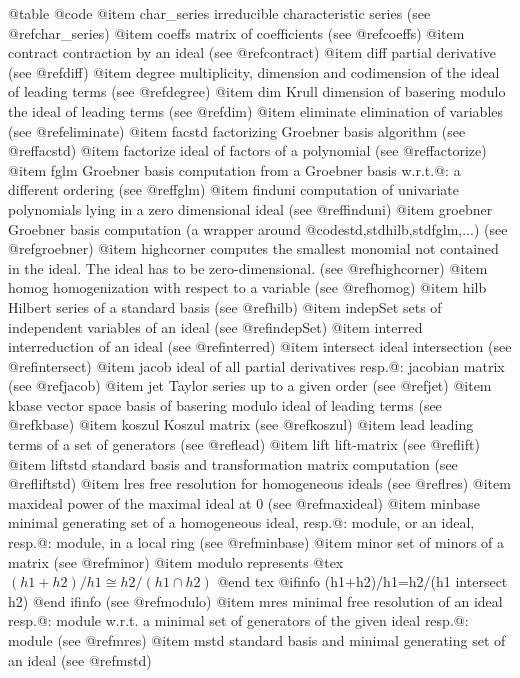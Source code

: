 @table @code
@item char_series
irreducible characteristic series (see @ref{char_series})
@item coeffs
matrix of coefficients (see @ref{coeffs})
@item contract
contraction by an ideal (see @ref{contract})
@item diff
partial derivative (see @ref{diff})
@item degree
multiplicity, dimension and codimension of the ideal of leading terms (see @ref{degree})
@item dim
Krull dimension of basering modulo the ideal of leading terms (see @ref{dim})
@item eliminate
elimination of variables (see @ref{eliminate})
@item facstd
factorizing Groebner basis algorithm (see @ref{facstd})
@item factorize
ideal of factors of a polynomial (see @ref{factorize})
@item fglm
Groebner basis computation from a Groebner basis w.r.t.@: a different
ordering (see @ref{fglm})
@item finduni
computation of univariate polynomials lying in a zero dimensional ideal
(see @ref{finduni})
@item groebner
Groebner basis computation (a wrapper around @code{std,stdhilb,stdfglm},...)
(see @ref{groebner})
@item highcorner
computes the smallest monomial not contained in the ideal.
The ideal has to be zero-dimensional.
(see @ref{highcorner})
@item homog
homogenization with respect to a variable (see @ref{homog})
@item hilb
Hilbert series of a standard basis (see @ref{hilb})
@item indepSet
sets of independent variables of an ideal (see @ref{indepSet})
@item interred
interreduction of an ideal (see @ref{interred})
@item intersect
ideal intersection (see @ref{intersect})
@item jacob
ideal of all partial derivatives resp.@: jacobian matrix (see @ref{jacob})
@item jet
Taylor series up to a given order (see @ref{jet})
@item kbase
vector space basis of basering modulo ideal of leading terms
(see @ref{kbase})
@item koszul
Koszul matrix (see @ref{koszul})
@item lead
leading terms of a set of generators (see @ref{lead})
@item lift
lift-matrix (see @ref{lift})
@item liftstd
standard basis and transformation matrix computation (see @ref{liftstd})
@item lres
free resolution for homogeneous ideals (see @ref{lres})
@item maxideal
power of the maximal ideal at 0 (see @ref{maxideal})
@item minbase
minimal generating set of a homogeneous ideal, resp.@: module, or an ideal, resp.@: module, in a local ring
(see @ref{minbase})
@item minor
set of minors of a matrix (see @ref{minor})
@item modulo
represents
@tex
$(h1+h2)/h1 \cong h2/(h1 \cap h2)$
@end tex
@ifinfo
(h1+h2)/h1=h2/(h1 intersect h2)
@end ifinfo
(see @ref{modulo})
@item mres
minimal free resolution of an ideal resp.@: module w.r.t. a minimal set of generators of the given ideal resp.@: module
(see @ref{mres})
@item mstd
standard basis and minimal generating set of an ideal (see @ref{mstd})
